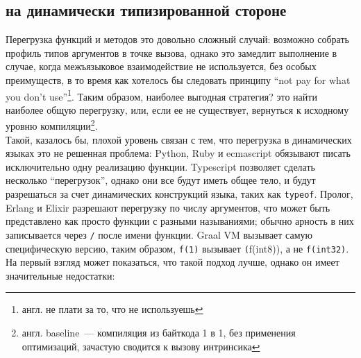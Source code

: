 \documentclass[times,specification,annotation]{itmo-student-thesis}
\begin{document}
\subsection{на динамически типизированной стороне}
Перегрузка функций и методов это довольно сложный случай: возможно собрать профиль типов аргументов в точке вызова, однако это замедлит выполнение в случае, когда межъязыковое взаимодействие не используется, без особых преимуществ, в то время как хотелось бы следовать принципу ``not pay for what you don't use''\footnote{англ. не плати за то, что не используешь}. Таким образом, наиболее выгодная стратегия? это найти наиболее общую перегрузку, или, если ее не существует, вернуться к исходному уровню компиляции\footnote{англ. baseline~--- компиляция из байткода 1 в 1, без применения оптимизаций, зачастую сводится к вызову интринсика}.\\
Такой, казалось бы, плохой уровень связан с тем, что перегрузка в динамических языках это не решенная проблема: Python, Ruby и ecmascript обязывают писать исключительно одну реализацию функции. Typescript позволяет сделать несколько ``перегрузок'', однако они все будут иметь общее тело, и будут разрешаться за счет динамических конструкций языка, таких как \texttt{typeof}. Пролог, Erlang и Elixir разрешают перегрузку по числу аргументов, что может быть представлено как просто функции с разными называниями; обычно арность в них записывается через \texttt{/} после имени функции.
Graal VM вызывает самую специфическую версию, таким образом, \texttt{f(1)} вызывает \texttt(f(int8)), а не \texttt{f(int32)}. На первый взгляд может показаться, что такой подход лучше, однако он имеет значительные недостатки:\\
\end{document}

